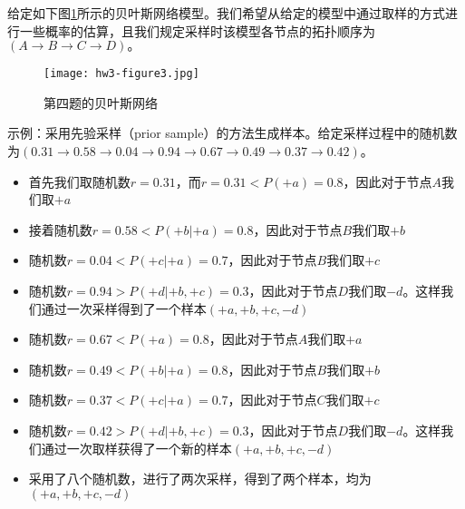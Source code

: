 \begin{problem}
\indent 给定如下图\ref{hw3-figure3}所示的贝叶斯网络模型。我们希望从给定的模型中通过取样的方式进行一些概率的估算，且我们规定采样时该模型各节点的拓扑顺序为$(A\rightarrow B\rightarrow C\rightarrow D)。$\\
\begin{figure}[!htbp]
    \centering
    \texttt{[image: hw3-figure3.jpg]}
    \caption{第四题的贝叶斯网络}
    \label{hw3-figure3}
\end{figure}

\indent 示例：采用先验采样（prior sample）的方法生成样本。给定采样过程中的随机数为$(0.31\rightarrow 0.58\rightarrow 0.04 \rightarrow 0.94 \rightarrow 0.67 \rightarrow 0.49 \rightarrow 0.37 \rightarrow 0.42)$。
\begin{itemize}
    \item 首先我们取随机数$r=0.31$，而$r=0.31<P(+a)=0.8$，因此对于节点$A$我们取$+a$
    \item 接着随机数$r=0.58<P(+b|+a)=0.8$，因此对于节点$B$我们取$+b$
    \item 随机数$r=0.04<P(+c|+a)=0.7$，因此对于节点$B$我们取$+c$
    \item 随机数$r=0.94>P(+d|+b, +c)=0.3$，因此对于节点$D$我们取$-d$。这样我们通过一次采样得到了一个样本$(+a, +b, +c, -d)$
    \item 随机数$r=0.67<P(+a)=0.8$，因此对于节点$A$我们取$+a$
    \item 随机数$r=0.49<P(+b|+a)=0.8$，因此对于节点$B$我们取$+b$
    \item 随机数$r=0.37<P(+c|+a)=0.7$，因此对于节点$C$我们取$+c$
    \item 随机数$r=0.42>P(+d|+b, +c)=0.3$，因此对于节点$D$我们取$-d$。这样我们通过一次取样获得了一个新的样本$(+a, +b, +c, -d)$
    \item 采用了八个随机数，进行了两次采样，得到了两个样本，均为$(+a, +b, +c, -d)$
\end{itemize}
\end{problem}

